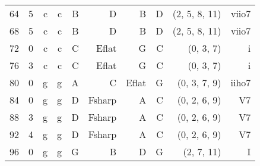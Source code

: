 \begin{tabular}{r|rrrrrrrrr}
64       & 5   & c    & c    & B            & D            & B           & D            & (2, 5, 8, 11) & viio7 \\
68       & 5   & c    & c    & B            & D            & B           & D            & (2, 5, 8, 11) & viio7 \\ \hline
72       & 0   & c    & c    & C            & E\gls{flat}  & G           & C            & (0, 3, 7)     & i     \\
76       & 3   & c    & c    & C            & E\gls{flat}  & G           & C            & (0, 3, 7)     & i     \\
80       & 0   & g    & g    & A            & C            & E\gls{flat} & G            & (0, 3, 7, 9)  & iiho7 \\
84       & 0   & g    & g    & D            & F\gls{sharp} & A           & C            & (0, 2, 6, 9)  & V7    \\
88       & 3   & g    & g    & D            & F\gls{sharp} & A           & C            & (0, 2, 6, 9)  & V7    \\
92       & 4   & g    & g    & D            & F\gls{sharp} & A           & C            & (0, 2, 6, 9)  & V7    \\ \hline
96       & 0   & g    & g    & G            & B            & D           & G            & (2, 7, 11)    & I     \\
\end{tabular}
